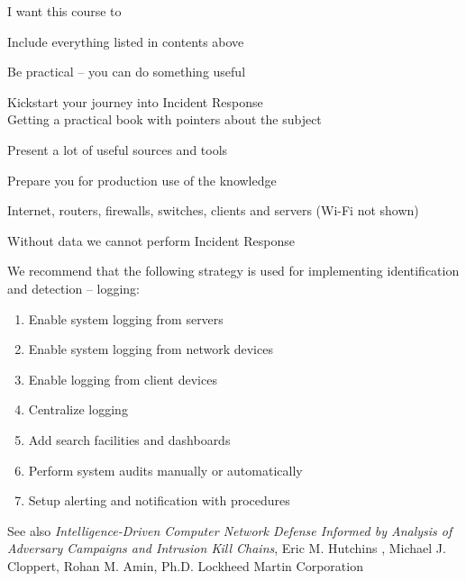 \documentclass[Screen16to9,17pt]{foils}
\begin{document}
I want this course to
\begin{list2}
\item Include everything listed in contents above
\item Be practical -- you can do something useful
\item Kickstart your journey into Incident Response\\
Getting a practical book with pointers about the subject
\item Present a lot of useful sources and tools
\item Prepare you for production use of the knowledge
\end{list2}




\begin{list2}
\item Internet, routers, firewalls, switches, clients and servers (Wi-Fi not shown)
\item Without data we cannot perform Incident Response
\end{list2}



We recommend that the following strategy is used for implementing identification and detection -- logging:
\begin{enumerate}
\item[\faSquareO] Enable system logging from servers
\item[\faSquareO] Enable system logging from network devices
\item[\faSquareO] Enable logging from client devices
\item[\faSquareO] Centralize logging
\item[\faSquareO] Add search facilities and dashboards
\item[\faSquareO] Perform system audits manually or automatically
\item[\faSquareO] Setup alerting and notification with procedures
\end{enumerate}




\begin{list2}
\item See also \emph{Intelligence-Driven Computer Network Defense Informed by Analysis of Adversary Campaigns and Intrusion Kill Chains}, Eric M. Hutchins , Michael J. Cloppert, Rohan M. Amin, Ph.D. Lockheed Martin Corporation\\{\footnotesize
 }
\end{list2}
\end{document}
